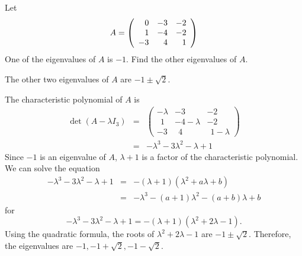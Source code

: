 \documentclass{ximera}
\author{Marty Golubitsky}
\begin{document}
\begin{exercise} \label{c10.2.25}
\rm Let
\[
A=\left(\begin{array}{rrr}  0 &  -3 &  -2 \\  1 &  -4 &  -2 \\  -3 &  4 &   1\end{array}\right)
\]
One of the eigenvalues of $A$ is $-1$.  Find the other eigenvalues of $A$.

\ans The other two eigenvalues of $A$ are $-1\pm \sqrt{2}$.

\soln The characteristic polynomial of $A$ is 
\begin{eqnarray*}
\det(A - \lambda I_3) & = & 
\begin{pmatrix}
-\lambda & -3 & -2 \\ \ \ 1 & -4 - \lambda & -2 \\ -3 & \ \ 4 & \ \ 1-\lambda
\end{pmatrix} \\ 
& = &  - \lambda^3 - 3\lambda^2 - \lambda +1
\end{eqnarray*}
Since $-1$ is an eigenvalue of $A$, $\lambda + 1$ is a factor of the characteristic polynomial.  We can solve the equation 
\begin{eqnarray*}
- \lambda^3 - 3\lambda^2 - \lambda +1 & = &  -(\lambda+1)(\lambda^2 + a\lambda + b) \\
& = & -\lambda^3 - (a+1)\lambda^2 - (a+b)\lambda + b 
\end{eqnarray*}
for
\[
- \lambda^3 - 3\lambda^2 - \lambda +1 = -(\lambda+1)(\lambda^2 +2 \lambda -1).
\]
Using the quadratic formula, the roots of $\lambda^2 +2 \lambda -1$ are $ -1 \pm \sqrt{2} $. Therefore, the eigenvalues are $-1, -1 + \sqrt{2}, -1 - \sqrt{2}$.


  

\end{exercise}
\end{document}
